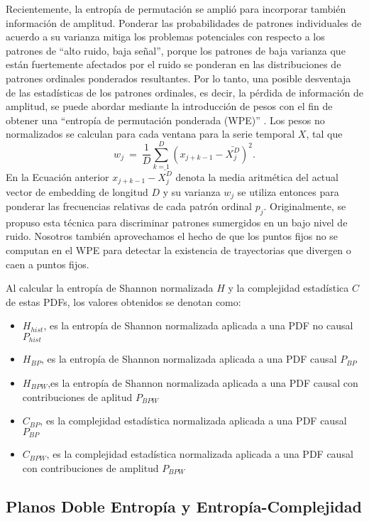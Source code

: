 Recientemente, la entropía de permutación se amplió para incorporar también información de amplitud.
Ponderar las probabilidades de patrones individuales de acuerdo a su varianza mitiga los problemas potenciales con respecto a los patrones de ``alto ruido, baja señal'', porque los patrones de baja varianza que están fuertemente afectados por el ruido se ponderan en las distribuciones de patrones ordinales ponderados resultantes.
Por lo tanto, una posible desventaja de las estadísticas de los patrones ordinales, es decir, la pérdida de información de amplitud, se puede abordar mediante la introducción de pesos con el fin de obtener una ``entropía de permutación ponderada (WPE)'' \cite{Fadlallah2013}.
Los pesos no normalizados se calculan para cada ventana para la serie temporal $X$, tal que
\begin{equation}
\label{WPE_weigth}
w_j~=~\frac{1}{D}\sum_{k=1}^{D} \left(x_{j+k-1}-\bar{X_j^D}\right)^2.
\end{equation}
En la Ecuación anterior $x_{j+k-1}-\bar{X_j^D}$ denota la media aritmética del actual vector de embedding de longitud $D$ y su varianza $w_j$ se utiliza entonces para ponderar las frecuencias relativas de cada patrón ordinal $p_j$.
Originalmente, se propuso esta técnica para discriminar patrones sumergidos en un bajo nivel de ruido.
Nosotros también aprovechamos el hecho de que los puntos fijos no se computan en el WPE para detectar la existencia de trayectorias que divergen o caen a puntos fijos.

Al calcular la entropía de Shannon normalizada $H$ y la complejidad estadística $C$ de estas PDFs, los valores obtenidos se denotan como:
\begin{itemize}
	\item $H_{hist}$, es la entropía de Shannon normalizada aplicada a una PDF no causal $P_{hist}$
	\item $H_{BP}$, es la entropía de Shannon normalizada aplicada a una PDF causal $P_{BP}$
	\item $H_{BPW}$,es la entropía de Shannon normalizada aplicada a una PDF causal con contribuciones de aplitud $P_{BPW}$
	\item $C_{BP}$, es la complejidad estadística normalizada aplicada a una PDF causal $P_{BP}$
	\item $C_{BPW}$, es la complejidad estadística normalizada aplicada a una PDF causal con contribuciones de amplitud $P_{BPW} $
\end{itemize}

\subsection{Planos Doble Entropía y Entropía-Complejidad}

